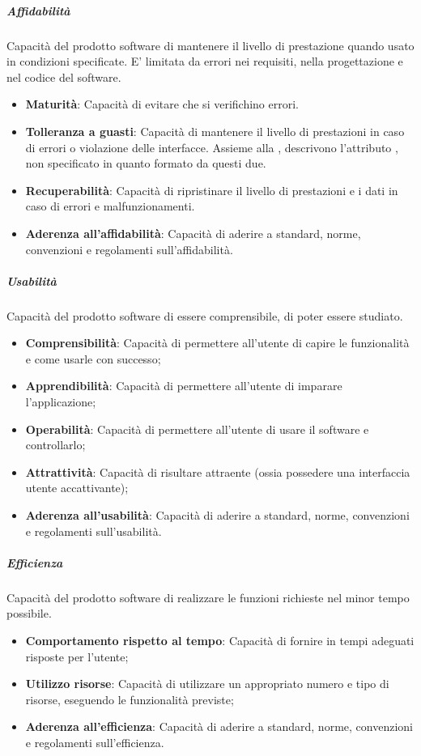\subparagraph*{Affidabilità}
Capacità del prodotto software di mantenere il livello di prestazione quando usato in condizioni specificate.
E’ limitata da errori nei requisiti, nella progettazione e nel codice del software.
\begin{itemize}
\item \textbf{Maturità}: Capacità di evitare che si verifichino errori.
\item \textbf{Tolleranza a guasti}: Capacità di mantenere il livello di prestazioni in caso di errori o violazione delle interfacce. Assieme alla , descrivono l’attributo , non specificato in quanto formato da questi due.
\item \textbf{Recuperabilità}: Capacità di ripristinare il livello di prestazioni e i dati in caso di errori e malfunzionamenti.
\item \textbf{Aderenza all’affidabilità}: Capacità di aderire a standard, norme, convenzioni e regolamenti sull’affidabilità.
\end{itemize}

\subparagraph*{Usabilità}
Capacità del prodotto software di essere comprensibile, di poter essere studiato.
\begin{itemize}
\item \textbf{Comprensibilità}: Capacità di permettere all’utente di capire le funzionalità e come usarle con successo;
\item \textbf{Apprendibilità}: Capacità di permettere all’utente di imparare l’applicazione;
\item \textbf{Operabilità}: Capacità di permettere all’utente di usare il software e controllarlo;
\item \textbf{Attrattività}: Capacità di risultare attraente (ossia possedere una interfaccia utente accattivante);
\item \textbf{Aderenza all’usabilità}: Capacità di aderire a standard, norme, convenzioni e regolamenti sull’usabilità.
\end{itemize}

\subparagraph*{Efficienza}
Capacità del prodotto software di realizzare le funzioni richieste nel minor tempo possibile.
\begin{itemize}
\item \textbf{Comportamento rispetto al tempo}: Capacità di fornire in tempi adeguati risposte per l’utente;
\item \textbf{Utilizzo risorse}: Capacità di utilizzare un appropriato numero e tipo di risorse, eseguendo le funzionalità previste;
\item \textbf{Aderenza all’efficienza}: Capacità di aderire a standard, norme, convenzioni e regolamenti sull’efficienza.
\end{itemize}

